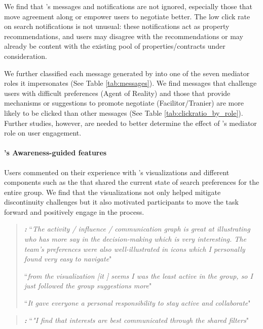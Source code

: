 We find that \cbot's messages and notifications are not ignored, especially those that move agreement along or empower users to negotiate better. The low click rate on search notifications is not unusual: these notifications act as property recommendations, and users may disagree with the recommendations or may already be content with the existing pool of properties/contracts under consideration. 

We further classified each message generated by \cbot into one of the seven mediator roles it impersonates (See Table \ref{tab:messages}). We find messages that challenge users with difficult preferences (Agent of Reality) and those that provide mechanisms or suggestions to promote negotiate (Facilitor/Tranier) are more likely to be clicked than other messages (See Table \ref{tab:clickratio_by_role}). Further studies, however, are needed to better determine the effect of \cbot's mediator role on user engagement.



\paragraph{\tool's Awareness-guided features}

Users commented on their experience with \tool's visualizations and different components such as the \collabQueryPanel that shared the current state of search preferences for the entire group. We find that the visualizations not only helped mitigate discontinuity challenges but it also motivated participants to move the task forward and positively engage in the process.
\begin{quote}
\textbf{\textit{\collaboRatio:}} ``\textit{The activity / influence / communication graph is great at illustrating who has more say in the decision-making which is very interesting. The team’s preferences were also well-illustrated in icons which I personally found very easy to navigate}" 

``\textit{from the visualization [it ] seems I
was the least active in the group, so I just followed the group suggestions more}"

``\textit{It gave everyone a personal responsibility to stay active and collaborate}"
\end{quote}

\begin{quote}
\textbf{\textit{\collabQueryPanel:}} ``\textit{"I find that interests are best communicated through the shared filters}" 
\end{quote}

